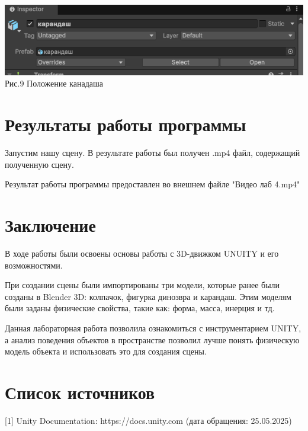 \documentclass[a4paper,12pt]{article}
\begin{document}
\begin{center}
	\includegraphics[scale = 0.5]{9.png}\\
	Рис.9 Положение канадаша
\end{center}

\newpage
\section{Результаты работы программы}

Запустим нашу сцену. В результате работы был получен .mp4 файл, содержащий полученную сцену. 

Результат работы программы предоставлен во внешнем файле "Видео лаб 4.mp4"

\newpage
	\section*{Заключение}
В ходе работы были освоены основы работы с 3D-движком UNUITY и его возможностями.

При создании сцены были импортированы три модели, которые ранее были созданы в Blender 3D: колпачок, фигурка динозвра и карандаш. Этим моделям были заданы физические свойства, такие как: форма, масса, инерция и тд.

Данная лабораторная работа позволила ознакомиться с инструментарием UNITY, а анализ поведения объектов в пространстве позволил лучше понять физическую модель объекта и использовать это для создания сцены.

\newpage
	\section*{Список источников}
	
[1] Unity Documentation: https://docs.unity.com (дата обращения: 25.05.2025)
\end{document}
